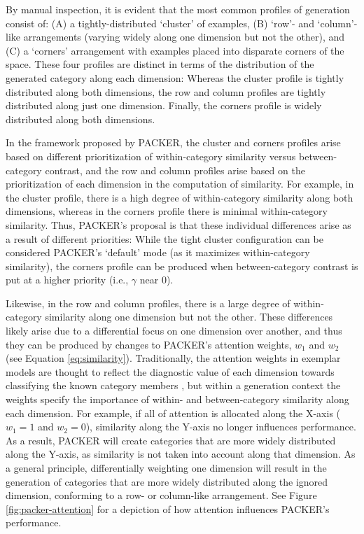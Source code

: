 \documentclass[12pt]{article}
\begin{document}
\begin{flushleft}
By manual inspection, it is evident that the most common profiles of generation consist of: (A) a tightly-distributed `cluster' of examples, (B) `row'- and `column'-like arrangements (varying widely along one dimension but not the other), and (C) a `corners' arrangement with examples placed into disparate corners of the space. These four profiles are distinct in terms of the distribution of the generated category along each dimension: Whereas the cluster profile is tightly distributed along both dimensions, the row and column profiles are tightly distributed along just one dimension. Finally, the corners profile is widely distributed along both dimensions.

In the framework proposed by PACKER, the cluster and corners profiles arise based on different prioritization of within-category similarity versus between-category contrast, and the row and column profiles arise based on the prioritization of each dimension in the computation of similarity. For example, in the cluster profile, there is a high degree of within-category similarity along both dimensions, whereas in the corners profile there is minimal within-category similarity. Thus, PACKER's proposal is that these individual differences arise as a result of different priorities: While the tight cluster configuration can be considered PACKER's `default' mode (as it maximizes within-category similarity), the corners profile can be produced when between-category contrast is put at a higher priority (i.e., $\gamma$ near $0$).

Likewise, in the row and column profiles, there is a large degree of within-category similarity along one dimension but not the other. These differences likely arise due to a differential focus on one dimension over another, and thus they can be produced by changes to PACKER's attention weights, $w_1$ and $w_2$ (see Equation \ref{eq:similarity}). Traditionally, the attention weights in exemplar models are thought to reflect the diagnostic value of each dimension towards classifying the known category members \citep{nosofsky1984choice,nosofsky1986attention,kruschke1992alcove}, but within a generation context the weights specify the importance of within- and between-category similarity along each dimension. For example, if all of attention is allocated along the X-axis ($w_1=1$ and $w_2=0$), similarity along the Y-axis no longer influences performance. As a result, PACKER will create categories that are more widely distributed along the Y-axis, as similarity is not taken into account along that dimension. As a general principle, differentially weighting one dimension will result in the generation of categories that are more widely distributed along the ignored dimension, conforming to a row- or column-like arrangement. See Figure \ref{fig:packer-attention} for a depiction of how attention influences PACKER's performance. 


\end{flushleft}
\end{document}
